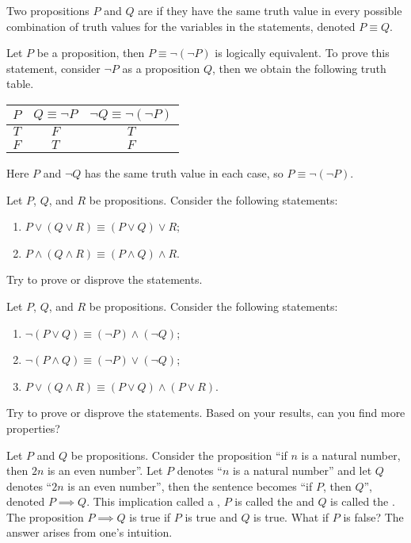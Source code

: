 \documentclass[10pt]{article}
\begin{document}
\par
Two propositions $P$ and $Q$ are  if they have the same truth value in every possible combination of truth values for the variables in the statements, denoted $P\equiv Q$.
\begin{example}
    Let $P$ be a proposition, then $P\equiv\neg(\neg P)$ is logically equivalent. To prove this statement, consider $\neg P$ as a proposition $Q$, then we obtain the following truth table.
    \begin{center}
        \begin{tabular}{c|cc}
            $P$ & $Q\equiv\neg P$ & $\neg Q\equiv\neg(\neg P)$ \\
            \hline
            $T$ & $F$ & $T$ \\
            $F$ & $T$ & $F$
        \end{tabular}
    \end{center}
    Here $P$ and $\neg Q$ has the same truth value in each case, so $P\equiv\neg(\neg P)$.
\end{example}
\begin{problem}
    Let $P$, $Q$, and $R$ be propositions. Consider the following statements:
    \begin{enumerate}
        \item $P\vee(Q\vee R)\equiv(P\vee Q)\vee R$;
        \item $P\wedge(Q\wedge R)\equiv(P\wedge Q)\wedge R$.
    \end{enumerate}
    Try to prove or disprove the statements.
\end{problem}
\begin{problem}
    Let $P$, $Q$, and $R$ be propositions. Consider the following statements:
    \begin{enumerate}
        \item $\neg(P\vee Q)\equiv(\neg P)\wedge(\neg Q)$;
        \item $\neg(P\wedge Q)\equiv(\neg P)\vee(\neg Q)$;
        \item $P\vee(Q\wedge R)\equiv(P\vee Q)\wedge(P\vee R)$.
    \end{enumerate}
    Try to prove or disprove the statements. Based on your results, can you find more properties?
\end{problem}
\par
Let $P$ and $Q$ be propositions. Consider the proposition ``if $n$ is a natural number, then $2n$ is an even number''. Let $P$ denotes ``$n$ is a natural number'' and let $Q$ denotes ``$2n$ is an even number'', then the sentence becomes ``if $P$, then $Q$'', denoted $P\implies Q$. This implication called a , $P$ is called the  and $Q$ is called the . The proposition $P\implies Q$ is true if $P$ is true and $Q$ is true. What if $P$ is false? The answer arises from one's intuition.
\end{document}
